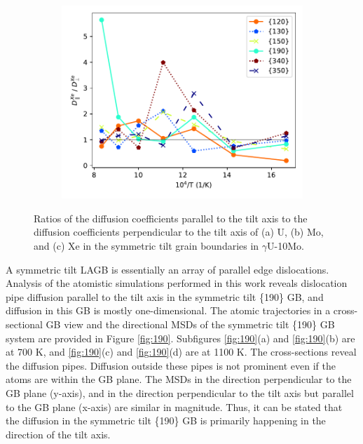 \documentclass{elsarticle}
\begin{document}
\begin{figure}[!ht]
\begin{subfigure}{0.49\textwidth}
    \end{subfigure}
    \begin{subfigure}{0.49\textwidth}
        \centering
        \caption{}
        \includegraphics[width=\textwidth]{ratio_Xe.pdf}
    \end{subfigure}
\caption{Ratios of the diffusion coefficients parallel to the tilt axis to the diffusion coefficients perpendicular to the tilt axis of (a) U, (b) Mo, and (c) Xe in the symmetric tilt grain boundaries in $\gamma$U-10Mo.}
\label{fig:ratio}
\end{figure}

A symmetric tilt LAGB is essentially an array of parallel edge dislocations. Analysis of the atomistic simulations performed in this work reveals dislocation pipe diffusion parallel to the tilt axis in the symmetric tilt \{190\} GB, and diffusion in this GB is mostly one-dimensional. The atomic trajectories in a cross-sectional GB view and the directional MSDs of the symmetric tilt \{190\} GB system are provided in Figure \ref{fig:190}. Subfigures \ref{fig:190}(a) and \ref{fig:190}(b) are at 700 K, and \ref{fig:190}(c) and \ref{fig:190}(d) are at 1100 K. The cross-sections reveal the diffusion pipes. Diffusion outside these pipes is not prominent even if the atoms are within the GB plane. The MSDs in the direction perpendicular to the GB plane (y-axis), and in the direction perpendicular to the tilt axis but parallel to the GB plane (x-axis) are similar in magnitude. Thus, it can be stated that the diffusion in the symmetric tilt \{190\} GB is primarily happening in the direction of the tilt axis.
\end{document}
